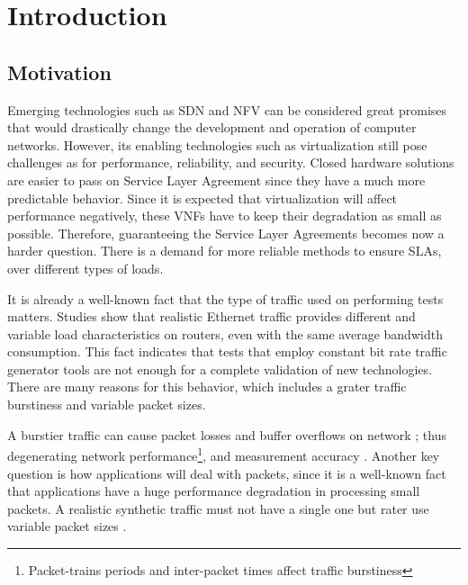 \chapter{Introduction}\label{ch:introduction}

\section{Motivation}
 

Emerging technologies such as SDN and NFV can be considered great promises that would drastically change the development and operation of computer networks. However, its enabling technologies such as virtualization still pose challenges as for performance,  reliability, and security\cite{nfv-challenges}. Closed hardware solutions are easier to pass on Service Layer Agreement since they have a much more predictable behavior. Since it is expected that virtualization will affect performance negatively, these VNFs have to keep their degradation as small as possible. Therefore, guaranteeing the Service Layer Agreements becomes now a harder question. There is a demand for more reliable methods to ensure SLAs, over different types of loads.


It is already a well-known fact that the type of traffic used on performing tests matters. Studies show that  realistic Ethernet traffic provides different and variable load characteristics on routers\cite{harpoon-validation}, even with the same average bandwidth consumption. This fact indicates that tests that employ constant bit rate traffic generator tools are not enough for a complete validation of new technologies. There are many reasons for this behavior, which includes a grater traffic burstiness and variable packet sizes.


A burstier traffic can cause packet losses and buffer overflows on network \cite{burstiness-queue-lenght} \cite{modelling-of-self-similar} \cite{empirical-interarrival-study}; thus degenerating network performance\footnote{Packet-trains periods and inter-packet times affect traffic burstiness}, and  measurement accuracy\cite{legotg-paper} \cite{background-traffic-matter}. Another key question is how applications will deal with packets, since it is a well-known fact that applications have a huge performance degradation in processing small packets\cite{comparative-trafficgen-tools}. A realistic synthetic traffic must not have a single one but rater use variable packet sizes \cite{packet-distribution-model}. 


